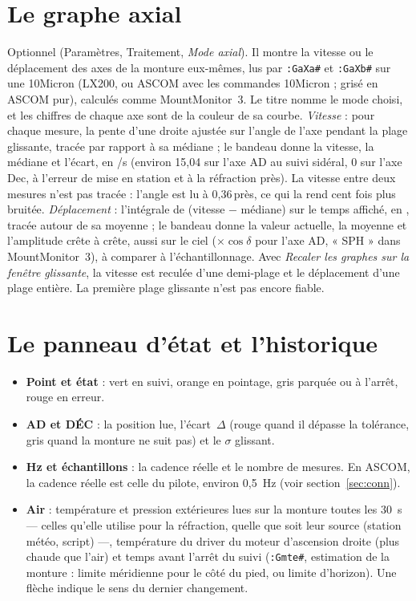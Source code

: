 \section{Le graphe axial}

Optionnel (Paramètres, Traitement, \emph{Mode axial}). Il montre la vitesse
ou le déplacement des axes de la monture eux-mêmes, lus par
\texttt{:GaXa\#} et \texttt{:GaXb\#} sur une 10Micron (LX200, ou ASCOM avec les
commandes 10Micron ; grisé en ASCOM pur), calculés comme MountMonitor~3. Le
titre nomme le mode choisi, et les chiffres de chaque axe sont de la couleur de sa courbe. \emph{Vitesse} : pour
chaque mesure, la pente d'une droite ajustée sur l'angle de l'axe pendant la
plage glissante, tracée par rapport à sa médiane ; le bandeau donne la
vitesse, la médiane et l'écart, en \arcsec/s (environ 15,04 sur l'axe AD au
suivi sidéral, 0 sur l'axe Dec, à l'erreur de mise en station et à la
réfraction près). La vitesse entre deux mesures n'est pas tracée : l'angle
est lu à 0,36\,\arcsec près, ce qui la rend cent fois plus bruitée.
\emph{Déplacement} : l'intégrale de (vitesse $-$ médiane) sur le temps
affiché, en \arcsec, tracée autour de sa moyenne ; le bandeau donne la valeur
actuelle, la moyenne et l'amplitude crête à crête, aussi sur le ciel
($\times\cos\delta$ pour l'axe AD, « SPH » dans MountMonitor~3), à comparer
à l'échantillonnage. Avec \emph{Recaler les graphes sur la fenêtre glissante},
la vitesse est reculée d'une demi-plage et le déplacement d'une plage
entière. La première plage glissante n'est pas encore fiable.

\section{Le panneau d'état et l'historique}
\label{sec:panel}

\begin{itemize}
  \item \textbf{Point et état} : vert en suivi, orange en pointage, gris
  parquée ou à l'arrêt, rouge en erreur.
  \item \textbf{AD et DÉC} : la position lue, l'écart~$\Delta$ (rouge quand il
  dépasse la tolérance, gris quand la monture ne suit pas) et le $\sigma$ glissant.
  \item \textbf{Hz et échantillons} : la cadence réelle et le nombre de
  mesures. En ASCOM, la cadence réelle est celle du pilote, environ 0,5~Hz
  (voir section~\ref{sec:conn}).
  \item \textbf{Air} : température et pression extérieures lues sur la monture
  toutes les 30~s --- celles qu'elle utilise pour la réfraction, quelle que soit
  leur source (station météo, script) ---, température du driver du moteur
  d'ascension droite (plus chaude que l'air) et temps avant l'arrêt du suivi (\texttt{:Gmte\#},
  estimation de la monture : limite méridienne pour le côté du pied, ou
  limite d'horizon). Une
  flèche indique le sens du dernier changement.
\end{itemize}

